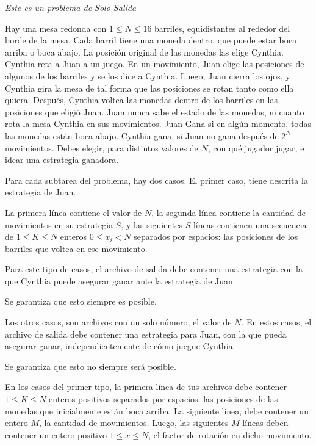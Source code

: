 \documentclass[12pt]{scrartcl}
\begin{document}
    
    {\itshape Este es un problema de Solo Salida}
    
    \vspace{10pt}

    Hay una mesa redonda con $1 \le N \le 16$ barriles, equidistantes al rededor del borde de la mesa. Cada barril tiene una moneda dentro, que puede estar boca arriba o boca abajo. La posición original de las monedas las elige Cynthia. Cynthia reta a Juan a un juego. En un movimiento, Juan elige las posiciones de algunos de los barriles y se los dice a Cynthia. Luego, Juan cierra los ojos, y Cynthia gira la mesa de tal forma que las posiciones se rotan tanto como ella quiera. Después, Cynthia voltea las monedas dentro de los barriles en las posiciones que eligió Juan. Juan nunca sabe el estado de las monedas, ni cuanto rota la mesa Cynthia en sus movimientos. Juan Gana si en algún momento, todas las monedas están boca abajo. Cynthia gana, si Juan no gana después de $2^N$ movimientos. 
    Debes elegir, para distintos valores de $N$, con qué jugador jugar, e idear una estrategia ganadora.
    

    Para cada subtarea del problema, hay dos casos. El primer caso, tiene descrita la estrategia de Juan. 

    La primera línea contiene el valor de $N$, la segunda línea contiene la cantidad de movimientos en su estrategia $S$, y las siguientes $S$ líneas contienen una secuencia de $1 \le K \le N$ enteros $0 \le x_i < N$ separados por espacios: las posiciones de los barriles que voltea en ese movimiento.

    Para este tipo de casos, el archivo de salida debe contener una estrategia con la que Cynthia puede asegurar ganar ante la estrategia de Juan.

    Se garantiza que esto siempre es posible.

    Los otros casos, son archivos con un solo número, el valor de $N$. En estos casos, el archivo de salida debe contener una estrategia para Juan, con la que pueda asegurar ganar, independientemente de cómo juegue Cynthia.
    
    Se garantiza que esto no siempre será posible. 

    

        En los casos del primer tipo, la primera línea de tus archivos debe contener $1 \le K \le N$ enteros positivos separados por espacios: las posiciones de las monedas que inicialmente están boca arriba. La siguiente línea, debe contener un entero $M$, la cantidad de movimientos. Luego, las siguientes $M$ líneas deben contener un entero positivo $1 \le x \le N$, el factor de rotación en dicho movimiento. 
\end{document}
